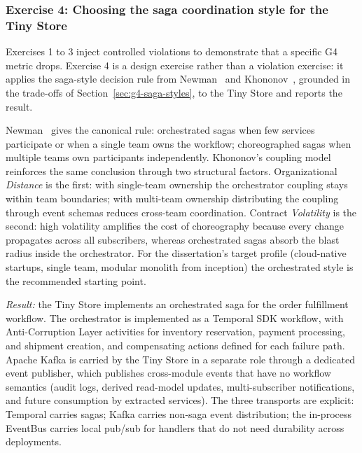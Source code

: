 \subsubsection*{Exercise 4: Choosing the saga coordination style for the Tiny Store}

Exercises 1 to 3 inject controlled violations to demonstrate that a specific G4 metric drops. Exercise 4 is a design exercise rather than a violation exercise: it applies the saga-style decision rule from Newman~\cite{newman2019monolith} and Khononov~\cite{khononov2024balancing}, grounded in the trade-offs of Section~\ref{sec:g4-saga-styles}, to the Tiny Store and reports the result.

Newman~\cite{newman2019monolith} gives the canonical rule: orchestrated sagas when few services participate or when a single team owns the workflow; choreographed sagas when multiple teams own participants independently. Khononov's coupling model~\cite{khononov2024balancing} reinforces the same conclusion through two structural factors. Organizational \emph{Distance} is the first: with single-team ownership the orchestrator coupling stays within team boundaries; with multi-team ownership distributing the coupling through event schemas reduces cross-team coordination. Contract \emph{Volatility} is the second: high volatility amplifies the cost of choreography because every change propagates across all subscribers, whereas orchestrated sagas absorb the blast radius inside the orchestrator. For the dissertation's target profile (cloud-native startups, single team, modular monolith from inception) the orchestrated style is the recommended starting point.

\noindent\emph{Result:} the Tiny Store implements an orchestrated saga for the order fulfillment workflow. The orchestrator is implemented as a Temporal SDK workflow, with Anti-Corruption Layer activities for inventory reservation, payment processing, and shipment creation, and compensating actions defined for each failure path. Apache Kafka is carried by the Tiny Store in a separate role through a dedicated event publisher, which publishes cross-module events that have no workflow semantics (audit logs, derived read-model updates, multi-subscriber notifications, and future consumption by extracted services). The three transports are explicit: Temporal carries sagas; Kafka carries non-saga event distribution; the in-process EventBus carries local pub/sub for handlers that do not need durability across deployments.

